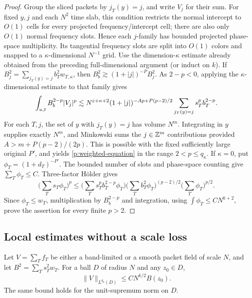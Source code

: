 \begin{proof}
Group the sliced packets by $j_T(y)=j$, and write $V_j$ for their sum.
For fixed $y,j$ and each $N^2$
time slab, this condition restricts the normal intercept to $O(1)$
cells for every projected frequency/intercept cell; there are also only
$O(1)$ normal frequency slots.  Hence each $j$-family has bounded
projected phase-space multiplicity.  Its tangential frequency slots
are split into $O(1)$ colors and snapped to a $\kappa$-dimensional
$N^{-1}$ grid.  Use the dimension-$\kappa$ estimate already obtained
from the preceding full-dimensional argument (or induct on $k$).
If
$B_j^2=\sum_{j_T(y)=j}b_T^2w_{T,\kappa}$, then
$B_b^2\gtrsim(1+|j|)^{-P}B_j^2$.  As $2-p<0$, applying the
$\kappa$-dimensional estimate to that family gives
\[
 \int_{u,t} B_b^{2-p}|V_j|^p
 \lesssim N^{\varepsilon+\kappa+2}
 (1+|j|)^{-Ap+P(p-2)/2}
 \sum_{j_T(y)=j}s_T^pb_T^{2-p}.
\]
For each $T,j$, the set of $y$ with $j_T(y)=j$ has volume $N^m$.
Integrating in $y$ supplies exactly $N^m$, and Minkowski sums the
$j\in\mathbb Z^m$ contributions provided $A>m+P(p-2)/(2p)$.  This is possible
with the fixed sufficiently large original $P'$, and yields
\eqref{p:weighted-equation} in the range $2<p\le q_\kappa$.
If $\kappa=0$, put $\phi_T=(1+d_T)^{-P'}$.  The bounded
number of slots and phase-space counting give $\sum_T\phi_T\leq C$.
Three-factor H\"older gives
\[
 \Big(\sum_Ts_T\phi_T\Big)^p
 \leq\Big(\sum_Ts_T^pb_T^{2-p}\phi_T\Big)
       \Big(\sum_Tb_T^2\phi_T\Big)^{(p-2)/2}
       \Big(\sum_T\phi_T\Big)^{p/2}.
\]
Since $\phi_T\leq w_T$, multiplication by $B_b^{2-p}$ and integration,
using $\int\phi_T\leq CN^{k+2}$, prove the assertion for every finite $p>2$.
\end{proof}

\subsection{Local estimates without a scale loss}

\begin{proposition}\label{p:local-linear}
Let $V=\sum_Tf_T$ be either a band-limited or a smooth packet field of scale
$N$, and let $B^2=\sum_Ts_T^2w_T$.  For a ball $D$ of radius $N$ and any
$z_0\in D$,
\begin{equation}\label{p:local-linear-equation}
 \|V\|_{L^{q_k}(D)}\leq C N^{k/2}B(z_0).
\end{equation}
The same bound holds for the unit-supremum norm on $D$.
\end{proposition}

